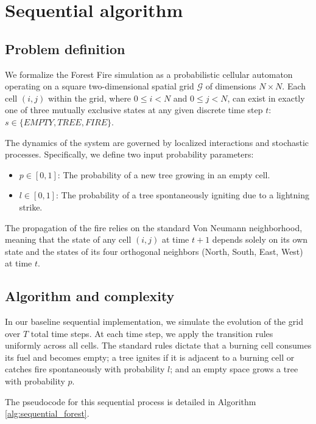 \section{Sequential algorithm}

\subsection{Problem definition}
We formalize the Forest Fire simulation as a probabilistic cellular automaton operating on a square two-dimensional spatial grid $\mathcal{G}$ of dimensions $N \times N$. Each cell $(i, j)$ within the grid, where $0 \le i < N$ and $0 \le j < N$, can exist in exactly one of three mutually exclusive states at any given discrete time step $t$: $s \in \{EMPTY, TREE, FIRE\}$. 

The dynamics of the system are governed by localized interactions and stochastic processes. Specifically, we define two input probability parameters:
\begin{itemize}
    \item $p \in [0, 1]$: The probability of a new tree growing in an empty cell.
    \item $l \in [0, 1]$: The probability of a tree spontaneously igniting due to a lightning strike.
\end{itemize}
The propagation of the fire relies on the standard Von Neumann neighborhood, meaning that the state of any cell $(i, j)$ at time $t+1$ depends solely on its own state and the states of its four orthogonal neighbors (North, South, East, West) at time $t$.

\subsection{Algorithm and complexity}
In our baseline sequential implementation, we simulate the evolution of the grid over $T$ total time steps. At each time step, we apply the transition rules uniformly across all cells. The standard rules dictate that a burning cell consumes its fuel and becomes empty; a tree ignites if it is adjacent to a burning cell or catches fire spontaneously with probability $l$; and an empty space grows a tree with probability $p$.

The pseudocode for this sequential process is detailed in Algorithm \ref{alg:sequential_forest}.

